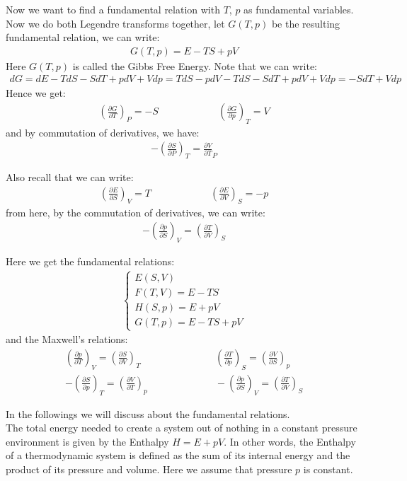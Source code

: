 \documentclass[11pt,oneside]{book}
\theoremstyle{break}
\theoremstyle{break}
\newcommand{\pd}{\partial}
\newcommand{\lr}[1]{\left( #1 \right)}
\begin{document}
Now we want to find a fundamental relation with $T$, $p$ as fundamental variables. Now we do both Legendre transforms together, let $G(T,p)$ be the resulting fundamental relation, we can write:
\begin{align*}
G(T,p) = E-TS+pV
\end{align*}
Here $G(T,p)$ is called the Gibbs Free Energy. Note that we can write:
\begin{align*}
dG = dE - TdS - SdT + pdV+Vdp = TdS-pdV-TdS-SdT+pdV+Vdp = -SdT + Vdp
\end{align*}
Hence we get:
\begin{align*}
\lr{\frac{\pd G}{\pd T}}_P = -S \qquad\qquad\qquad \lr{\frac{\pd G}{\pd p}}_T = V
\end{align*}
and by commutation of derivatives, we have:
\begin{align*}
-\lr{\frac{\pd S}{\pd P}}_T = \frac{\pd V}{\pd T}_P
\end{align*}

Also recall that we can write:
\begin{align*}
\lr{\frac{\pd E}{\pd S}}_V = T \qquad\qquad\qquad \lr{\frac{\pd E}{\pd V}}_S = -p
\end{align*}
from here, by the commutation of derivatives, we can write:
\begin{align*}
-\lr{\frac{\pd p}{\pd S}}_V = \lr{\frac{\pd T}{\pd V}}_S
\end{align*}

Here we get the fundamental relations:
\begin{align*}
\begin{cases}
E(S,V) \\
F(T,V) =E-TS\\
H(S,p) =E+pV\\
G(T,p) =E-TS+pV
\end{cases}
\end{align*}
and the Maxwell's relations:
\begin{align*}
\lr{\frac{\pd p}{\pd T}}_V = \lr{\frac{\pd S}{\pd V}}_T \qquad&\qquad \qquad \lr{\frac{\pd T}{\pd p}}_S = \lr{\frac{\pd V}{\pd S}}_p \\
-\lr{\frac{\pd S}{\pd p}}_T = \lr{\frac{\pd V}{\pd T}}_p\qquad&\qquad\qquad
-\lr{\frac{\pd p}{\pd S}}_V = \lr{\frac{\pd T}{\pd V}}_S
\end{align*}

\hfill\break\hfill\break
In the followings we will discuss about the fundamental relations.\\

The total energy needed to create a system out of nothing in a constant pressure environment is given by the Enthalpy $H = E+pV$. In other words, the Enthalpy of a thermodynamic system is defined as the sum of its internal energy and the product of its pressure and volume. Here we assume that pressure $p$ is constant.\\
\end{document}
